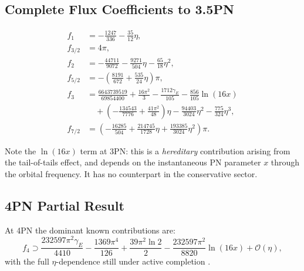 \documentclass[11pt,a4paper]{article}
\theoremstyle{definition}
\theoremstyle{remark}
\begin{document}
	\subsection{Complete Flux Coefficients to 3.5PN}
	
	\begin{align}
		f_1 &= -\frac{1247}{336} - \frac{35}{12}\eta,
		\label{eq:f1}\\
		f_{3/2} &= 4\pi,
		\label{eq:f15}\\
		f_2 &= -\frac{44711}{9072} - \frac{9271}{504}\eta - \frac{65}{18}\eta^2,
		\label{eq:f2}\\
		f_{5/2} &= -\left(\frac{8191}{672} + \frac{535}{24}\eta\right)\pi,
		\label{eq:f25}\\
		f_3 &= \frac{6643739519}{69854400} + \frac{16\pi^2}{3}
		- \frac{1712\gamma_E}{105} - \frac{856}{105}\ln(16x)
		\nonumber\\
		&\quad
		+ \left(-\frac{134543}{7776} + \frac{41\pi^2}{48}\right)\eta
		- \frac{94403}{3024}\eta^2 - \frac{775}{324}\eta^3,
		\label{eq:f3}\\
		f_{7/2} &= \left(-\frac{16285}{504} + \frac{214745}{1728}\eta
		+ \frac{193385}{3024}\eta^2\right)\pi.
		\label{eq:f35}
	\end{align}
	
	Note the $\ln(16x)$ term at 3PN: this is a \emph{hereditary} contribution
	arising from the tail-of-tails effect, and depends on the instantaneous
	PN parameter $x$ through the orbital frequency.  It has no counterpart
	in the conservative sector.
	
	\subsection{4PN Partial Result}
	
	At 4PN the dominant known contributions are:
	\begin{equation}
		f_4 \supset \frac{232597\pi^2\gamma_E}{4410}
		- \frac{1369\pi^4}{126}
		+ \frac{39\pi^2\ln 2}{2}
		- \frac{232597\pi^2}{8820}\ln(16x)
		+ \mathcal{O}(\eta),
		\label{eq:f4_partial}
	\end{equation}
	with the full $\eta$-dependence still under active completion
	\cite{Blanchet2024}.
	
\end{document}
